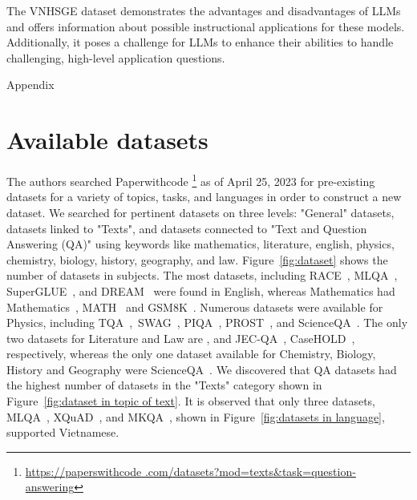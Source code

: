 \documentclass{article}
\begin{document}
{	The VNHSGE dataset demonstrates the advantages and disadvantages of LLMs and offers information about possible instructional applications for these models. Additionally, it poses a challenge for LLMs to enhance their abilities to handle challenging, high-level application questions.
	
  
	  
			
	\appendix
	\newpage
	
	{\LARGE Appendix}
	
	\section{Available datasets}
	
	\label{paperwithcode}
	
	The authors searched Paperwithcode \footnote{\href{https://paperswithcode.com/datasets?mod=texts&task=question-answering}{https://paperswithcode .com/datasets?mod=texts\&task=question-answering}} as of April 25, 2023 for pre-existing datasets for a variety of topics, tasks, and languages in order to construct a new dataset. We searched for pertinent datasets on three levels: "General" datasets, datasets linked to "Texts", and datasets connected to "Text and Question Answering (QA)" using keywords like mathematics, literature, english, physics, chemistry, biology, history, geography, and law. Figure~\ref{fig:dataset} shows the number of datasets in subjects. The most datasets, including RACE~\cite{Lai2017}, MLQA~\cite{lewis2019mlqa}, SuperGLUE~\cite{wang2019superglue}, and DREAM~\cite{sun2019dream} were found in English, whereas Mathematics had Mathematics~\cite{saxton2019analysing}, MATH~\cite{hendrycks2021measuring} and GSM8K~\cite{cobbe2021training}. Numerous datasets were available for Physics, including TQA~\cite{kembhavi2017you},~SWAG~\cite{zellers2018swag}, PIQA~\cite{bisk2020piqa}, PROST~\cite{aroca2021prost}, and ScienceQA~\cite{lu2022learn}. The only two datasets for Literature and Law are \cite{shaham2022scrolls}, \cite{taktasheva2022tape} and  JEC-QA~\cite{zhong2020jec}, CaseHOLD~\cite{zheng2021does}, respectively, whereas the only one dataset available for Chemistry, Biology, History and Geography were ScienceQA~\cite{lu2022learn}.  We discovered that QA datasets had the highest number of datasets in the "Texts" category shown in Figure~\ref{fig:dataset in topic of text}. It is observed that only three datasets, MLQA~\cite{lewis2019mlqa}, XQuAD~\cite{artetxe2019cross}, and MKQA~\cite{longpre2021mkqa}, shown in Figure~\ref{fig:datasets in language}, supported Vietnamese.
	


}
\end{document}
